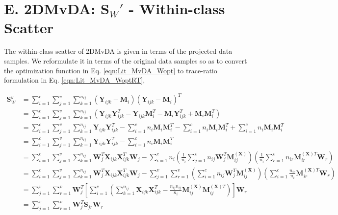 \section*{E. 2DMvDA: $\textbf{S}_W'$ - Within-class Scatter}
\label{proof:2DMvDA_Sjr}
The within-class scatter of 2DMvDA is given in terms of the projected data samples. We reformulate it in terms of the original data samples so as to convert the optimization function in Eq. \ref{eqn:Lit_MvDA_Wopt} to trace-ratio formulation in Eq. \ref{eqn:Lit_MvDA_WoptRT},

\vspace{-0.5cm}
\begin{equation*}
\begin{split}
\textbf{S}_W^y & = \sum_{i=1}^{c} \sum_{j=1}^{v} \sum_{k=1}^{n_{ij}} \left ( \textbf{Y}_{ijk} - \textbf{M}_{i} \right ) \left ( \textbf{Y}_{ijk} - \textbf{M}_{i} \right )^T
\\
& = \sum_{i=1}^{c} \sum_{j=1}^{v} \sum_{k=1}^{n_{ij}} \left ( \textbf{Y}_{ijk} \textbf{Y}_{ijk}^T - \textbf{Y}_{ijk} \textbf{M}_i^T - \textbf{M}_i \textbf{Y}_{ijk}^T + \textbf{M}_i \textbf{M}_i^T \right )
\\
& = \sum_{i=1}^{c} \sum_{j=1}^{v} \sum_{k=1}^{n_{ij}} \textbf{Y}_{ijk} \textbf{Y}_{ijk}^T - \sum_{i=1}^{c} n_i \textbf{M}_i \textbf{M}_i^T - \sum_{i=1}^{c} n_i \textbf{M}_i \textbf{M}_i^T + \sum_{i=1}^{c} n_i \textbf{M}_i \textbf{M}_i^T
\\
& =  \sum_{i=1}^{c} \sum_{j=1}^{v} \sum_{k=1}^{n_{ij}} \textbf{Y}_{ijk} \textbf{Y}_{ijk}^T - \sum_{i=1}^{c} n_i \textbf{M}_i \textbf{M}_i^T
\\
& = \sum_{i=1}^{c} \sum_{j=1}^{v} \sum_{k=1}^{n_{ij}} \textbf{W}_j^T \textbf{X}_{ijk} \textbf{X}_{ijk}^T \textbf{W}_j - \sum_{i=1}^{c} n_i \left ( \frac{1}{n_i} \sum_{j=1}^{v} n_{ij} \textbf{W}_j^T \textbf{M}_{ij}^{(\textbf{X})} \right ) \left (\frac{1}{n_i} \sum_{r=1}^{v} n_{ir} \textbf{M}_{ir}^{(\textbf{X})T} \textbf{W}_r \right )
\\
& = \sum_{i=1}^{c} \sum_{j=1}^{v} \sum_{k=1}^{n_{ij}} \textbf{W}_j^T \textbf{X}_{ijk} \textbf{X}_{ijk}^T \textbf{W}_j - \sum_{j=1}^{v} \sum_{r=1}^{v} \left ( \sum_{i=1}^{c} n_{ij} \textbf{W}_j^T \textbf{M}_{ij}^{(\textbf{X})} \right ) \left ( \sum_{i=1}^{c} \frac{n_{ir}}{n_i}  \textbf{M}_{ir}^{(\textbf{X})T} \textbf{W}_r \right )
\\
& = \sum_{j=1}^{v} \sum_{r=1}^{v} \textbf{W}_j^T \left [ \sum_{i=1}^{c} \left ( \sum_{k=1}^{n_{ij}} \textbf{X}_{ijk }\textbf{X}_{ijk}^T - \frac{n_{ij} n_{ij}}{n_i} \textbf{M}_{ij}^{(\textbf{X})} \textbf{M}_{ij}^{(\textbf{X})T} \right )  \right ] \textbf{W}_r
\\
& = \sum_{j=1}^{v} \sum_{r=1}^{v} \textbf{W}_j^T \textbf{S}_{jr} \textbf{W}_r \\
\end{split}
\end{equation*}


